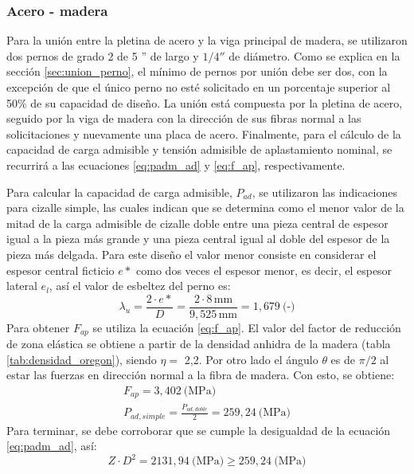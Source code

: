 \subsubsection{Acero - madera}
Para la unión entre la pletina de acero y la viga principal de madera, se utilizaron dos pernos de grado 2 de 5 '' de largo y  $1/4''$ de diámetro. Como se explica en la sección \ref{sec:union_perno}, el mínimo de pernos por unión debe ser dos, con la excepción de que el único perno no esté solicitado en un porcentaje superior al 50\% de su capacidad de diseño. La unión está compuesta por la pletina de acero, seguido por la viga de madera con la dirección de sus fibras normal a las solicitaciones y nuevamente una placa de acero. Finalmente, para el cálculo de la capacidad de carga admisible y tensión admisible de aplastamiento nominal, se recurrirá a las ecuaciones \ref{eq:padm_ad} y \ref{eq:f_ap}, respectivamente. 

Para calcular la capacidad de carga admisible, $P_{ad}$, se utilizaron las indicaciones para cizalle simple, las cuales indican que se determina como el menor valor de la mitad de la carga admisible de cizalle doble entre una pieza central de espesor igual a la pieza más grande y una pieza central igual al doble del espesor de la pieza más delgada. Para este diseño el valor menor consiste en considerar el espesor central ficticio $e*$ como dos veces el espesor menor, es decir, el espesor lateral $e_l$, así el valor de esbeltez del perno es:  
\begin{equation*}
	\lambda_u = \frac{2\cdot e*}{D} = \frac{2\cdot 8\, \text{mm}}{9,525\, \text{mm}} = 1,679\: \text{(-)}
\end{equation*}
Para obtener $F_{ap}$ se utiliza la ecuación \ref{eq:f_ap}. El valor del factor de reducción de zona elástica se obtiene a partir de la densidad anhidra de la madera (tabla \ref{tab:densidad_oregon}), siendo $\eta =$ 2,2. Por otro lado el ángulo $\theta$ es de $\pi/2$ al estar las fuerzas en dirección normal a la fibra de madera. Con esto, se obtiene:
\begin{gather}
	F_{ap} = 3,402 \: \text{(MPa)} \\
	P_{ad,simple} =\frac{P_{ad,doble}}{2} = 259,24 \: \text{(MPa)}
\end{gather}
Para terminar, se debe corroborar que se cumple la desigualdad de la ecuación \ref{eq:padm_ad}, así:
\begin{equation*}
	Z\cdot D^2 = 2131,94 \: \text{(MPa)} \geq 259,24 \: \text{(MPa)}
\end{equation*}

